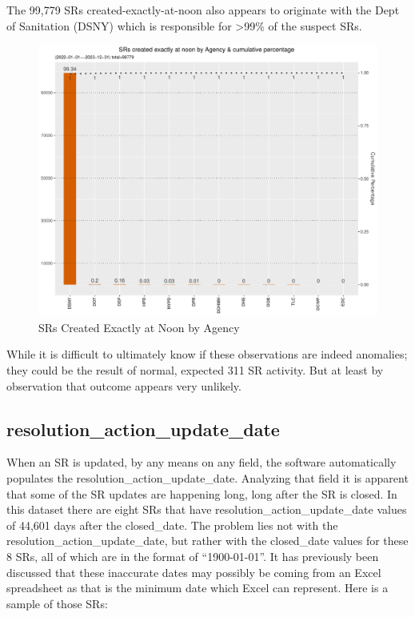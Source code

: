 \documentclass[12pt, titlepage]{article}
\begin{document}
	The 99,779 SRs created-exactly-at-noon also appears to 
	originate with the Dept of Sanitation (DSNY) which is responsible 
	for \textgreater99\% of the suspect SRs.
	
	\begin{figure}[tbp]
		\centering
		\includegraphics[width = \textwidth]{created_at_noon_chart.pdf}
		\caption{SRs Created Exactly at Noon by Agency}
		\label{fig:noon-created}
	\end{figure}		
		
	While it is difficult to ultimately know if these observations 
	are indeed anomalies; they could be the result of normal, 
	expected 311 SR activity. But at least by observation that 
	outcome appears very unlikely.	
		
\subsection{resolution\_action\_update\_date}
\label{sec: resolutionaction}
	When an SR is updated, by any means on any field, the software 
	automatically populates the resolution\_action\_update\_date. 
	Analyzing that field it is apparent that some of the SR updates 
	are happening long, long after the SR is closed. In this dataset 
	there are eight SRs that have resolution\_action\_update\_date values 
	of 44,601 days after the closed\_date. The problem lies not with 
	the  resolution\_action\_update\_date, but rather with the closed\_date 
	values for these 8 SRs, all of which are in the format of ``1900-01-01''. 
	It has previously been discussed that these inaccurate dates may 
	possibly be coming from an Excel spreadsheet as that is the minimum 
	date which Excel can represent. Here is a sample of those SRs:
\end{document}
